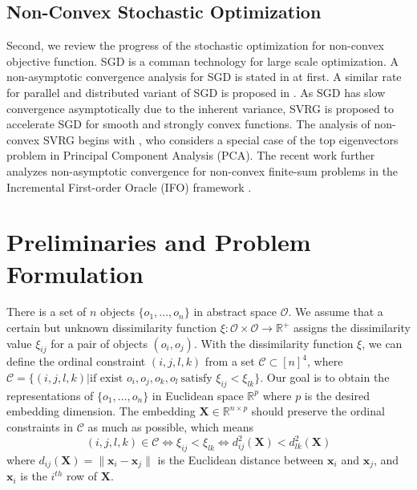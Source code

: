 \documentclass[letterpaper]{article}
\newcommand{\qqxu}[1]{\textcolor[rgb]{0.00,1.00,0.00}{#1}}
\begin{document}
		\subsection{Non-Convex Stochastic Optimization}
		Second, we review the progress of the stochastic optimization for non-convex objective function. SGD is a comman technology for large scale optimization. A non-asymptotic convergence analysis for SGD is stated in \cite{ghadimi2013stochastic} at first. A similar rate for parallel and distributed variant of SGD is \qqxu{proposed} in \cite{NIPS2015_5751}. As SGD has slow convergence asymptotically due to the inherent variance, SVRG \cite{rie2013accelerating} is proposed to accelerate SGD for smooth and strongly convex functions. The analysis of non-convex SVRG begins with \cite{icml2015_shamir15}, who considers a special case of the top eigenvectors problem in Principal Component Analysis (PCA). The recent work \cite{reddic2016nonconvex} further \qqxu{analyzes} non-asymptotic convergence for non-convex finite-sum problems in the Incremental First-order Oracle (IFO) framework \cite{icml2015_agarwal15}.

		\section{Preliminaries and Problem Formulation}

		There is a set of $n$ objects $\{o_1,\dots,o_n\}$ in abstract space $\mathcal{O}$. We assume that a certain but unknown dissimilarity function $\xi:\mathcal{O}\times\mathcal{O}\rightarrow\mathbb{R}^{+}$ assigns the dissimilarity value $\xi_{ij}$ for a pair of objects $(o_i,o_j)$. With the dissimilarity function $\xi$, we can define the ordinal constraint $(i,j,l,k)$ from a set $\mathcal{C}\subset[n]^4$, \qqxu{where} $\mathcal{C}=\{(i,j,l,k)|\text{if exist\ }o_i,o_j,o_k,o_l\ \text{satisfy }\xi_{ij}<\xi_{lk}\}.$	Our goal is to obtain the representations of $\{o_1,\dots,o_n\}$ in Euclidean space $\mathbb{R}^{p}$ where $p$ is the desired embedding dimension. The embedding $\mathbf{X}\in\mathbb{R}^{n\times p}$ should preserve the ordinal constraints in $\mathcal{C}$ as much as possible, which means
		$$
		(i,j,l,k)\in\mathcal{C} \Leftrightarrow \xi_{ij} < \xi_{lk} \Leftrightarrow d^2_{ij}(\mathbf{X}) < d^2_{lk}(\mathbf{X})
		$$
		where $d_{ij}(\mathbf{X})=\|\mathbf{x}_i-\mathbf{x}_j\|$ is the Euclidean distance between $\mathbf{x}_i$ and $\mathbf{x}_j$, and $\mathbf{x}_i$ is the $i^{th}$ row of $\mathbf{X}$.
\end{document}
